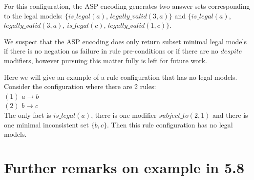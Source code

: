 For this configuration, the ASP encoding generates two answer sets corresponding to the legal models:
\newline
$\{is\_legal(a)$, $legally\_valid(3,a)\}$ and $\{is\_legal(a)$, $legally\_valid(3,a)$, $is\_legal(c)$, $legally\_valid(1,c)\}$.

We suspect that the ASP encoding does only return subset minimal legal models if there is no negation as failure in rule pre-conditions or if there are no $despite$ modifiers, however pursuing this matter fully is left for future work.

Here we will give an example of a rule configuration that has no legal models.
Consider the configuration where there are 2 rules:\\ $(1)$ $a\rightarrow b$\\
$(2)$ $b\rightarrow c$\\
The only fact is $is\_legal(a)$, there is one modifier $subject\_to(2,1)$ and there is one minimal inconsistent set $\{b,c\}$. Then this rule configuration has no legal models. 

\section{Further remarks on example in 5.8}


